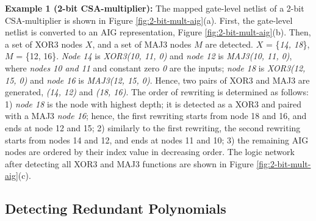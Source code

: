 \textbf{Example 1 (2-bit CSA-multiplier):} The mapped gate-level netlist of a 2-bit CSA-multiplier is shown in Figure \ref{fig:2-bit-mult-aig}(a). First, the gate-level netlist is converted to an AIG representation, Figure \ref{fig:2-bit-mult-aig}(b). Then, a set of XOR3 nodes $X$, and a set of MAJ3 nodes $M$ are detected. $X$ = \{\textit{14, 18}\}, $M$ = \{12, 16\}. \textit{Node 14} is \textit{XOR3(10, 11, 0)} and \textit{node 12} is \textit{MAJ3(10, 11, 0)}, where \textit{nodes 10 and 11} and constant zero \textit{0} are the inputs; \textit{node 18} is \textit{XOR3(12, 15, 0)} and \textit{node 16} is \textit{MAJ3(12, 15, 0)}. Hence, two pairs of XOR3 and MAJ3 are generated, \textit{(14, 12)} and \textit{(18, 16)}. The order of rewriting is determined as follows: 1) \textit{node 18} is the node with highest depth; it is detected as a XOR3 and paired with a MAJ3 \textit{node 16}; hence, the first rewriting starts from node 18 and 16, and ends at node 12 and 15; 2) similarly to the first rewriting, the second rewriting starts from nodes 14 and 12, and ends at nodes 11 and 10; 3) the remaining AIG nodes are ordered by their index value in decreasing order. The logic network after detecting all XOR3 and MAJ3 functions are shown in Figure \ref{fig:2-bit-mult-aig}(c). %


\subsection{Detecting Redundant Polynomials}

